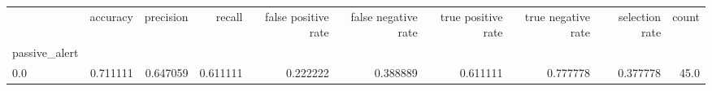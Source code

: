 \begin{tabular}{lrrrrrrrrr}
\toprule
{} &  accuracy &  precision &    recall &  false positive rate &  false negative rate &  true positive rate &  true negative rate &  selection rate &  count \\
passive\_alert &           &            &           &                      &                      &                     &                     &                 &        \\
\midrule
0.0           &  0.711111 &   0.647059 &  0.611111 &             0.222222 &             0.388889 &            0.611111 &            0.777778 &        0.377778 &   45.0 \\
\bottomrule
\end{tabular}
